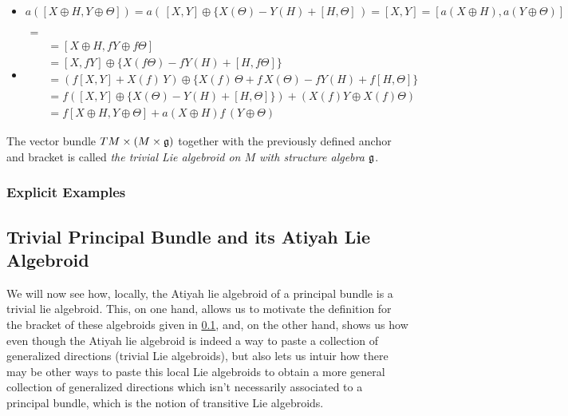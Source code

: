     \begin{itemize}
    \item $a([X \oplus H, Y \oplus \Theta]) = a(\, [X, Y] \oplus \{X(\Theta) - Y(H) + [H, \Theta] \,) = [X, Y] = [a(X \oplus H), a(Y \oplus \Theta)]$
    
    \item 
    \begin{align*}
        [X \oplus H, &f\cdot (Y \oplus \Theta)] =\\
        &= [X \oplus H, fY \oplus f\Theta] \\
        &=  [X, fY] \oplus \{X(f\Theta) - fY(H) + [H, f\Theta]\} \\
        &= (f[X, Y] + X(f)\,Y) \oplus \{X(f)\,\Theta + f\,X(\Theta) - fY(H) + f[H, \Theta]\} \\
        &=f([X, Y] \oplus \{ X(\Theta) -Y(H) + [H, \Theta]\} ) + (X(f) Y \oplus X(f)\Theta) \\
        &= f[X \oplus H, Y \oplus \Theta] + a(X \oplus H)f \, (Y \oplus \Theta)
    \end{align*}
    \end{itemize}

The vector bundle $TM \times (M \times \mathfrak{g})$ together with the previously defined anchor and bracket is called \emph{the trivial Lie algebroid on $M$ with structure algebra $\mathfrak{g}$}.

\subsubsection{Explicit Examples}





\subsection{Trivial Principal Bundle and its Atiyah Lie Algebroid}

We will now see how, locally, the Atiyah lie algebroid of a principal bundle is a trivial lie algebroid. This, on one hand, allows us to motivate the definition for the bracket of these algebroids given in \ref{}, and, on the other hand, shows us how even though the Atiyah lie algebroid is indeed a way to paste a collection of generalized directions (trivial Lie algebroids), but also lets us intuir how there may be other ways to paste this local Lie algebroids to obtain a more general collection of generalized directions which isn't necessarily associated to a principal bundle, which is the notion of transitive Lie algebroids.

